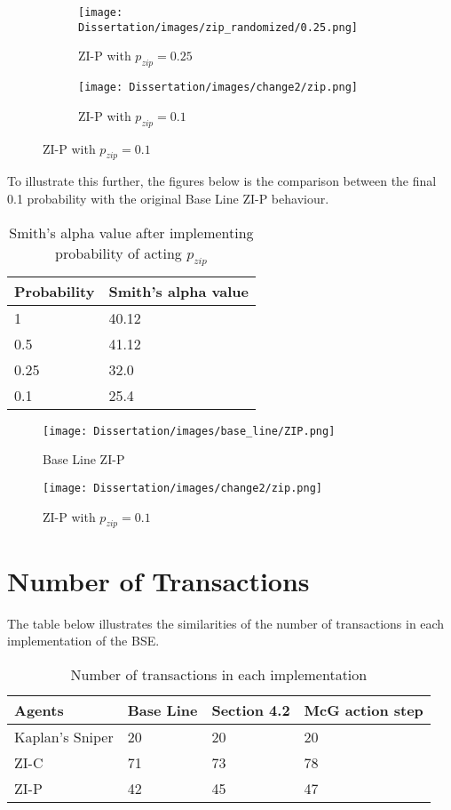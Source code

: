 \begin{figure}[h]
  \begin{subfigure}[b]{0.5\textwidth}
    \texttt{[image: Dissertation/images/zip\_randomized/0.25.png]}
    \caption{ZI-P with $p_{zip} = 0.25$}
    \label{fig:3}
  \end{subfigure}
  \begin{subfigure}[b]{0.5\textwidth}
    \texttt{[image: Dissertation/images/change2/zip.png]}
    \caption{ZI-P with $p_{zip} = 0.1$}
    \label{fig:4}
  \end{subfigure}
\end{figure}

To illustrate this further, the figures below is the comparison between the final 0.1 probability with the original Base Line ZI-P behaviour. 

\begin{table}[h]
\centering
\begin{tabular}{ |m||p{4cm}|} 
\hline
\textbf{Probability}& \textbf{Smith's alpha value} \\
\hline
\hline
1 & 40.12 \\ 
\hline
0.5 & 41.12\\ 
\hline
0.25 & 32.0 \\ 
\hline
0.1 & 25.4 \\ 
\hline
\end{tabular}
\caption{Smith's alpha value after implementing probability of acting $p_{zip}$}  
\end{table}
\FloatBarrier


\begin{figure}[h]
\texttt{[image: Dissertation/images/base\_line/ZIP.png]}
\caption{Base Line ZI-P} 
\end{figure} 
\FloatBarrier

\begin{figure}[h]
\texttt{[image: Dissertation/images/change2/zip.png]}
\caption{ZI-P with $p_{zip} = 0.1$} 
\end{figure} 
\FloatBarrier

\section{Number of Transactions}
The table below illustrates the similarities of the number of transactions in each implementation of the BSE.

\begin{table}[h]
\centering
\begin{tabular}{ |m||p{4cm}|p{4cm}|p{4cm}|} 
\hline
\textbf{Agents}& \textbf{Base Line} & \textbf{Section 4.2} & \textbf{McG action step} \\
\hline
\hline
Kaplan's Sniper & 20 & 20 & 20 \\ 
\hline
ZI-C & 71 & 73 & 78\\ 
\hline
ZI-P & 42 & 45 & 47 \\ 
\hline
\end{tabular}
\caption{Number of transactions in each implementation}  
\end{table}
\FloatBarrier